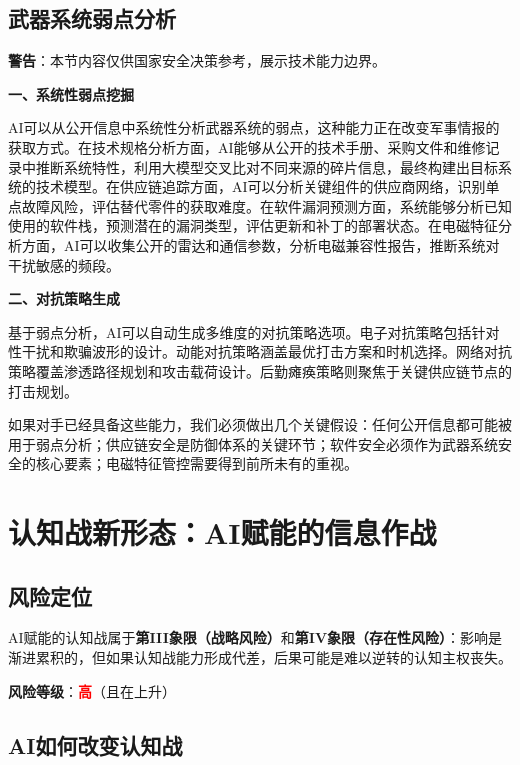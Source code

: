 \subsection{武器系统弱点分析}

\textbf{警告}：本节内容仅供国家安全决策参考，展示技术能力边界。

\textbf{一、系统性弱点挖掘}

AI可以从公开信息中系统性分析武器系统的弱点，这种能力正在改变军事情报的获取方式。在技术规格分析方面，AI能够从公开的技术手册、采购文件和维修记录中推断系统特性，利用大模型交叉比对不同来源的碎片信息，最终构建出目标系统的技术模型。在供应链追踪方面，AI可以分析关键组件的供应商网络，识别单点故障风险，评估替代零件的获取难度。在软件漏洞预测方面，系统能够分析已知使用的软件栈，预测潜在的漏洞类型，评估更新和补丁的部署状态。在电磁特征分析方面，AI可以收集公开的雷达和通信参数，分析电磁兼容性报告，推断系统对干扰敏感的频段。

\textbf{二、对抗策略生成}

基于弱点分析，AI可以自动生成多维度的对抗策略选项。电子对抗策略包括针对性干扰和欺骗波形的设计。动能对抗策略涵盖最优打击方案和时机选择。网络对抗策略覆盖渗透路径规划和攻击载荷设计。后勤瘫痪策略则聚焦于关键供应链节点的打击规划。

如果对手已经具备这些能力，我们必须做出几个关键假设：任何公开信息都可能被用于弱点分析；供应链安全是防御体系的关键环节；软件安全必须作为武器系统安全的核心要素；电磁特征管控需要得到前所未有的重视。


\section{认知战新形态：AI赋能的信息作战}

\subsection{风险定位}

AI赋能的认知战属于\textbf{第III象限（战略风险）}和\textbf{第IV象限（存在性风险）}：影响是渐进累积的，但如果认知战能力形成代差，后果可能是难以逆转的认知主权丧失。

\textbf{风险等级}：\textcolor{red}{\textbf{高}}（且在上升）

\subsection{AI如何改变认知战}

